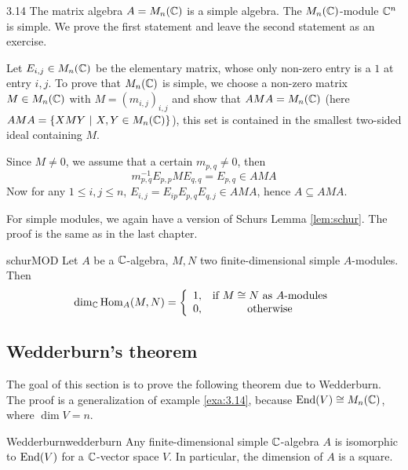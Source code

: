 \documentclass[twoside = false,	%
		headsepline,		%
		parskip = true,
		]{scrbook}						%
\begin{document}
    \begin{example}{}{3.14}%
        The matrix algebra $A = M_n(\mathbb C)$ is a simple algebra. The $M_n(\mathbb C)$-module $\mathbb C^n$ is simple. We prove the first statement and leave the second statement as an exercise.

        Let $E_{i,j} \in M_n(\mathbb C)$ be the elementary matrix, whose only non-zero entry is a $1$ at entry $i,j$. To prove that $M_n(\mathbb C)$ is simple, we choose a non-zero matrix $M \in M_n(\mathbb C)$ with $M = (m_{i,j})_{i,j}$ and show that $AMA = M_n(\mathbb C)$ (here $AMA = \left\{ XMY \ | \ X, Y \in M_n(\mathbb C)\right\}$), this set is contained in the smallest two-sided ideal containing $M$. %

        Since $M \neq 0$, we assume that a certain $m_{p,q} \neq 0$, then
        \begin{equation*}
            m_{p,q}^{-1} E_{p,p} M E_{q,q} = E_{p,q} \in AMA
        \end{equation*}
        Now for any $1 \leq i,j \leq n$, $E_{i,j} = E_{ip} E_{p,q} E_{q,j} \in AMA$, hence $A \subseteq AMA$.
    \end{example}

    For simple modules, we again have a version of Schurs Lemma \ref{lem:schur}. The proof is the same as in the last chapter.

    \begin{lemma}{}{schurMOD}
        Let $A$ be a $\mathbb C$-algebra, $M,N$ two finite-dimensional simple $A$-modules. Then
        \begin{equation*}
            \dim_{\mathbb C} \mathrm{Hom}_A(M,N) = \left\{ \begin{array}{rc}
                1, &  \text{if } M \cong N \text{ as $A$-modules}\\
                0, & \text{otherwise}
            \end{array}\right.
        \end{equation*}
        
    \end{lemma}

\subsection{Wedderburn's theorem}
    The goal of this section is to prove the following theorem due to Wedderburn. The proof is a generalization of example \ref{exa:3.14}, because $\mathrm{End}(V) \cong M_n(\mathbb C)$, where $\dim V = n$.

    \begin{theorem}{Wedderburn}{wedderburn}
        Any finite-dimensional simple $\mathbb C$-algebra $A$ is isomorphic to $\mathrm{End}(V)$ for a $\mathbb C$-vector space $V$. In particular, the dimension of $A$ is a square.
    \end{theorem}
\end{document}
